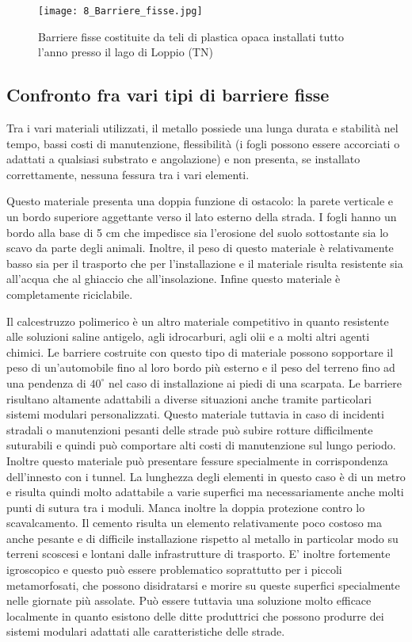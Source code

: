 \documentclass[11pt,a4paper,twoside]{memoir}
\begin{document}
\begin{figure}[H]
\label{fig:barr_fix}
\centering
  \texttt{[image: 8\_Barriere\_fisse.jpg]}
\caption{Barriere fisse costituite da teli di plastica opaca installati tutto l'anno presso il lago di Loppio (TN)}
\end{figure}

\subsection{Confronto fra vari tipi di barriere fisse}
Tra i vari materiali utilizzati, il metallo possiede una lunga durata e stabilità nel tempo, bassi costi di manutenzione, flessibilità (i fogli possono essere accorciati o adattati a qualsiasi substrato e angolazione) e non presenta, se installato correttamente, nessuna fessura tra i vari elementi.

Questo materiale presenta una doppia funzione di ostacolo: la parete verticale e un bordo superiore aggettante verso il lato esterno della strada. I fogli hanno un bordo alla base di 5 cm che impedisce sia l’erosione del suolo sottostante sia lo scavo da parte degli animali. Inoltre, il peso di questo materiale è relativamente basso sia per il trasporto che per l’installazione e il materiale risulta resistente sia all’acqua che al ghiaccio che all’insolazione. Infine questo materiale è completamente riciclabile. 

Il calcestruzzo polimerico è un altro materiale competitivo in quanto resistente alle soluzioni saline antigelo, agli idrocarburi, agli olii e a molti altri agenti chimici. Le barriere costruite con questo tipo di materiale possono sopportare il peso di un’automobile fino al loro bordo più esterno e il peso del terreno fino ad una pendenza di $40^{\circ}$ nel caso di installazione ai piedi di una scarpata. Le barriere risultano altamente adattabili a diverse situazioni anche tramite particolari sistemi modulari personalizzati. Questo materiale tuttavia in caso di incidenti stradali o manutenzioni pesanti delle strade può subire rotture difficilmente suturabili e quindi può comportare alti costi di manutenzione sul lungo periodo. Inoltre questo materiale può presentare fessure specialmente in corrispondenza dell’innesto con i tunnel. La lunghezza degli elementi in questo caso è di un metro e risulta quindi molto adattabile a varie superfici ma necessariamente anche molti punti di sutura tra i moduli. Manca inoltre la doppia protezione contro lo scavalcamento.
Il cemento risulta un elemento relativamente poco costoso ma anche pesante e di difficile installazione rispetto al metallo in particolar modo su terreni scoscesi e lontani dalle infrastrutture di trasporto. E’ inoltre fortemente igroscopico e questo può essere problematico soprattutto per i piccoli metamorfosati, che possono disidratarsi e morire su queste superfici specialmente nelle giornate più assolate. Può essere tuttavia una soluzione molto efficace localmente in quanto esistono delle ditte produttrici che possono produrre dei sistemi modulari adattati alle caratteristiche delle strade.
\end{document}
